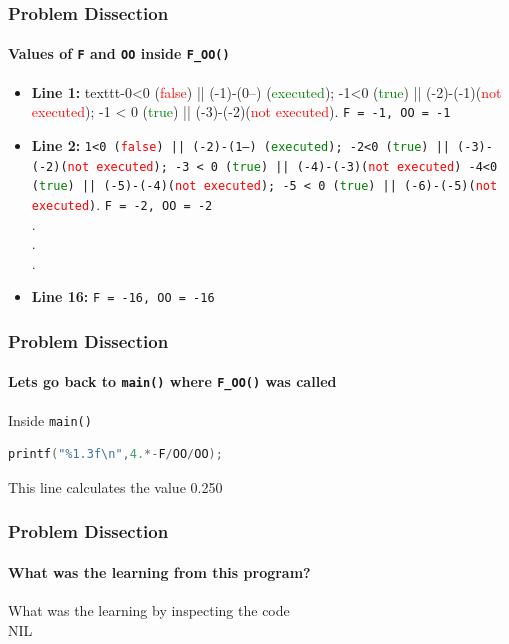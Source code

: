 \documentclass[12pt]{beamer}
\begin{document}
\begin{frame}[fragile]
	\frametitle{Problem Dissection}
	\framesubtitle{Values of \texttt{F} and \texttt{OO} inside \texttt{F\_OO()}}
	\begin{itemize}
	\item  {\tiny \textbf{Line 1:} texttt{-0<0 (\textcolor{red}{false}) || (-1)-(0--) (\textcolor{green}{executed}); -1<0 (\textcolor{green}{true}) || (-2)-(-1)(\textcolor{red}{not executed}); -1 < 0 (\textcolor{green}{true}) || (-3)-(-2)(\textcolor{red}{not executed})}}. {\tiny \texttt{F = -1, OO = -1}}
	\item {\tiny \textbf{Line 2:} \texttt{1<0 (\textcolor{red}{false}) || (-2)-(1--) (\textcolor{green}{executed}); -2<0 (\textcolor{green}{true}) || (-3)-(-2)(\textcolor{red}{not executed}); -3 < 0 (\textcolor{green}{true}) || (-4)-(-3)(\textcolor{red}{not executed}) -4<0 (\textcolor{green}{true}) || (-5)-(-4)(\textcolor{red}{not executed}); -5 < 0 (\textcolor{green}{true}) || (-6)-(-5)(\textcolor{red}{not executed})}}. {\tiny \texttt{F = -2, OO = -2}}
	\\.
	\\.
	\\.
	\item {\tiny \textbf{Line 16:} \texttt{F = -16, OO = -16} }
	\end{itemize}
\end{frame}

\begin{frame}[fragile]
	\frametitle{Problem Dissection}
	\framesubtitle{Lets go back to \texttt{main()} where \texttt{F\_OO()} was called}
	\begin{block}{Inside \texttt{main()}}
		\begin{lstlisting}[language=C]
			printf("%1.3f\n",4.*-F/OO/OO);
		\end{lstlisting}
		This line calculates the value 0.250 
	\end{block}
\end{frame}

\begin{frame}
	\frametitle{Problem Dissection}
	\framesubtitle{What was the learning from this program?}
	\begin{center}
		\small {What was the learning by inspecting the code} \\
		\huge {NIL}
	\end{center}
\end{frame}
\end{document}
